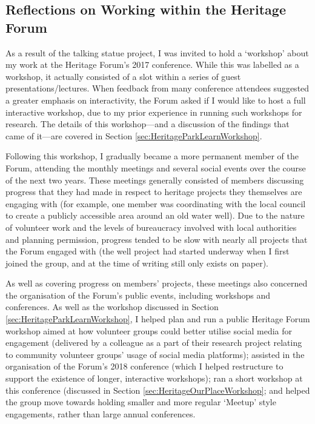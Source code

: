 \subsection{Reflections on Working within the Heritage Forum}
As a result of the talking statue project, I was invited to hold a `workshop' about my work at the Heritage Forum's 2017 conference. While this was labelled as a workshop, it actually consisted of a slot within a series of guest presentations/lectures. When feedback from many conference attendees suggested a greater emphasis on interactivity, the Forum asked if I would like to host a full interactive workshop, due to my prior experience in running such workshops for research. The details of this workshop---and a discussion of the findings that came of it---are covered in Section \ref{sec:HeritageParkLearnWorkshop}.

Following this workshop, I gradually became a more permanent member of the Forum, attending the monthly meetings and several social events over the course of the next two years. These meetings generally consisted of members discussing progress that they had made in respect to heritage projects they themselves are engaging with (for example, one member was coordinating with the local council to create a publicly accessible area around an old water well). Due to the nature of volunteer work and the levels of bureaucracy involved with local authorities and planning permission, progress tended to be slow with nearly all projects that the Forum engaged with (the well project had started underway when I first joined the group, and at the time of writing still only exists on paper). 

As well as covering progress on members' projects, these meetings also concerned the organisation of the Forum's public events, including workshops and conferences. As well as the workshop discussed in Section \ref{sec:HeritageParkLearnWorkshop}, I helped plan and run a public Heritage Forum workshop aimed at how volunteer groups could better utilise social media for engagement (delivered by a colleague as a part of their research project relating to community volunteer groups' usage of social media platforms); assisted in the organisation of the Forum's 2018 conference (which I helped restructure to support the existence of longer, interactive workshops); ran a short workshop at this conference (discussed in Section \ref{sec:HeritageOurPlaceWorkshop}; and helped the group move towards holding smaller and more regular `Meetup' style engagements, rather than large annual conferences.


